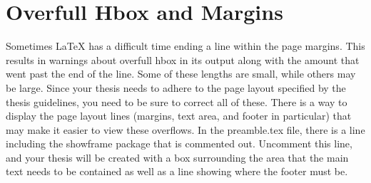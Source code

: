 \section{Overfull Hbox and Margins}
    Sometimes LaTeX has a difficult time ending a line within the page margins.
    This results in warnings about overfull hbox in its output along with the amount that went past the end of the line.
    Some of these lengths are small, while others may be large.
    Since your thesis needs to adhere to the page layout specified by the thesis guidelines, you need to be sure to correct all of these.
    There is a way to display the page layout lines (margins, text area, and footer in particular) that may make it easier to view these overflows.
    In the preamble.tex file, there is a line including the showframe package that is commented out.
    Uncomment this line, and your thesis will be created with a box surrounding the area that the main text needs to be contained as well as a line showing where the footer must be.

